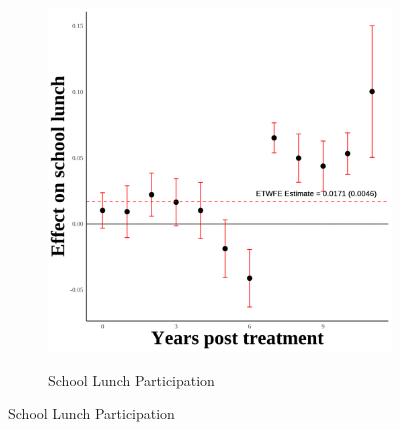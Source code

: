 \documentclass[12pt,english]{article}
\begin{document}
\begin{figure}[H]
\begin{subfigure}[b]{0.3\textwidth}
    \label{fig:ln-schl-lunch-secgen-hw}
  \end{subfigure}
  \hfill
  \begin{subfigure}[b]{0.3\textwidth}
    \centering
    \caption{School Lunch Participation}
    \includegraphics[width=\linewidth]{figures/plot36-schl_lunch_event_study-secgen-hw.png}
    \label{fig:schl-lunch-secgen-hw}
  \end{subfigure}

  \vspace{0.3cm} %


\end{figure}
\end{document}
